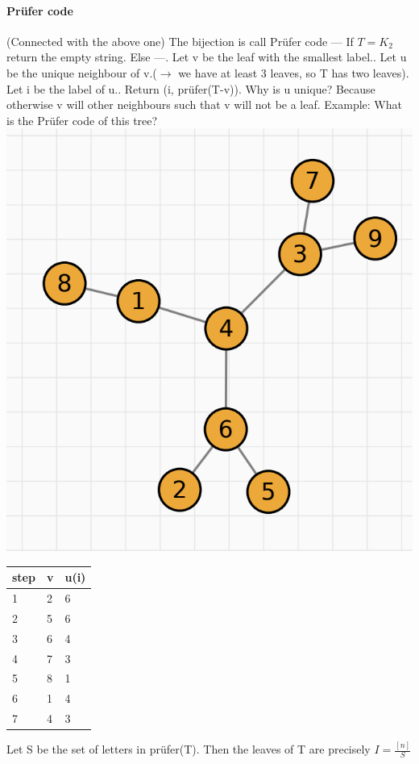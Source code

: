 \documentclass{article}
\begin{document}
\paragraph{Prüfer code}(Connected with the above one)\newline
The bijection is call Prüfer code —\newline
If $T=K_2$ return the empty string.\newline
Else —. Let v be the leaf with the smallest label.. Let u be the unique neighbour of v.($\longrightarrow$ we have at least 3 leaves, so T has two leaves). Let i be the label of u.. Return (i, prüfer(T-v)).\newline
Why is u unique?\newline
Because otherwise v will other neighbours such that v will not be a leaf.
Example: What is the Prüfer code of this tree?\newline
\includegraphics{0058}
{\begin{table}[H]
\begin{tabular}{|l|l|l|}
\hline
step & v & u(i) \\ \hline
1    & 2 & 6    \\ \hline
2    & 5 & 6    \\ \hline
3    & 6 & 4    \\ \hline
4    & 7 & 3    \\ \hline
5    & 8 & 1    \\ \hline
6    & 1 & 4    \\ \hline
7    & 4 & 3    \\ \hline
\end{tabular}
\end{table}
}
Let S be the set of letters in prüfer(T).\newline
Then the leaves of T are precisely $I=\frac{[n]}{S}$
\end{document}
